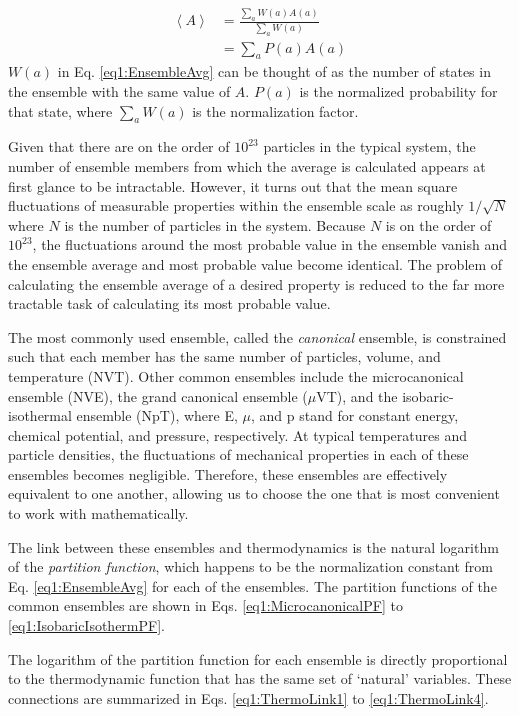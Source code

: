 \begin{align}
   \left < A \right > & = \frac {\sum_a W(a) A(a)} {\sum_a W(a)} \nonumber \\
                      & = \sum_a P(a) A(a)
   \label{eq1:EnsembleAvg}
\end{align}
$W(a)$ in Eq. \ref{eq1:EnsembleAvg} can be thought of as the number of states in
the ensemble with the same value of $A$. $P(a)$ is the normalized probability
for that state, where $\sum_a W(a)$ is the normalization factor.

Given that there are on the order of $10^{23}$ particles in the typical system,
the number of ensemble members from which the average is calculated appears at
first glance to be intractable. However, it turns out that the mean square
fluctuations of measurable properties within the ensemble scale as roughly $1 /
\sqrt{N}$ where $N$ is the number of particles in the system.  Because $N$ is on
the order of $10 ^ {23}$, the fluctuations around the most probable value in the
ensemble vanish and the ensemble average and most probable value become
identical. The problem of calculating the ensemble average of a desired property
is reduced to the far more tractable task of calculating its most probable
value.

The most commonly used ensemble, called the \emph{canonical} ensemble, is
constrained such that each member has the same number of particles, volume, and
temperature (NVT). Other common ensembles include the microcanonical ensemble
(NVE), the grand canonical ensemble ($\mu$VT), and the isobaric-isothermal
ensemble (NpT), where E, $\mu$, and p stand for constant energy, chemical
potential, and pressure, respectively. At typical temperatures and particle
densities, the fluctuations of mechanical properties in each of these ensembles
becomes negligible. Therefore, these ensembles are effectively equivalent to one
another, allowing us to choose the one that is most convenient to work with
mathematically.

The link between these ensembles and thermodynamics is the natural logarithm of
the \emph{partition function}, which happens to be the normalization constant
from Eq. \ref{eq1:EnsembleAvg} for each of the ensembles. The partition
functions of the common ensembles are shown in Eqs. \ref{eq1:MicrocanonicalPF}
to \ref{eq1:IsobaricIsothermPF}.

The logarithm of the partition function for each ensemble is directly
proportional to the thermodynamic function that has the same set of `natural'
variables. These connections are summarized in Eqs. \ref{eq1:ThermoLink1}
to \ref{eq1:ThermoLink4}. \cite{McQuarrie_Book_StatMech_1973}

